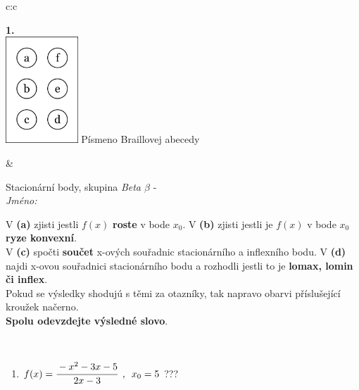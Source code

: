 \documentclass[10pt]{report}
\begin{document}
\begin{tabular}{c:c}
\begin{minipage}[c][104.5mm][t]{0.5\linewidth}
\begin{center}
\begin{minipage}{0.79\linewidth}
\end{minipage}
\begin{minipage}{0.20\linewidth}
\begin{center}
{\Huge\bfseries 1.} \\[2mm]
\includegraphics[height=40mm]{../images/braille.png}
{\small Písmeno Braillovej abecedy}
\end{center}
\end{minipage}
\end{center}
\end{minipage}
&
\begin{minipage}[c][104.5mm][t]{0.5\linewidth}
\begin{center}
\vspace{7mm}
{\huge Stacionární body, skupina \textit{Beta $\beta$} -}\\[5mm]
\textit{Jméno:}\phantom{xxxxxxxxxxxxxxxxxxxxxxxxxxxxxxxxxxxxxxxxxxxxxxxxxxxxxxxxxxxxxxxxx}\\[5mm]
\begin{minipage}{0.95\linewidth}
\begin{center}
{\small V \textbf{(a)} zjisti jestli $f(x)$ \textbf{roste} v bode $x_0$. V \textbf{(b)} zjisti jestli je $f(x)$ v bode $x_0$ \textbf{ryze konvexní}.\\V \textbf{(c)} spočti \textbf{součet} x-ových souřadnic stacionárního a inflexního bodu. V \textbf{(d)} najdi x-ovou souřadnici stacionárního bodu a rozhodli jestli to je \textbf{lomax, lomin či inflex}.\\Pokud se výsledky shodujú s těmi za otazníky, tak napravo obarvi příslušející kroužek načerno.\\\textbf{Spolu odevzdejte výsledné slovo}}.
\end{center}
\end{minipage}
\\[1mm]
\begin{minipage}{0.79\linewidth}
\begin{center}
\begin{varwidth}{\linewidth}
\begin{enumerate}
\normalsize
\item $f(x)=\cfrac{-x^2-3x-5}{2x-3}\enspace , \enspace x_0=5$\quad \dotfill\; ???\;\dotfill \quad {}

\end{enumerate}
\end{varwidth}
\end{center}
\end{minipage}
\end{center}
\end{minipage}
\end{tabular}
\end{document}

